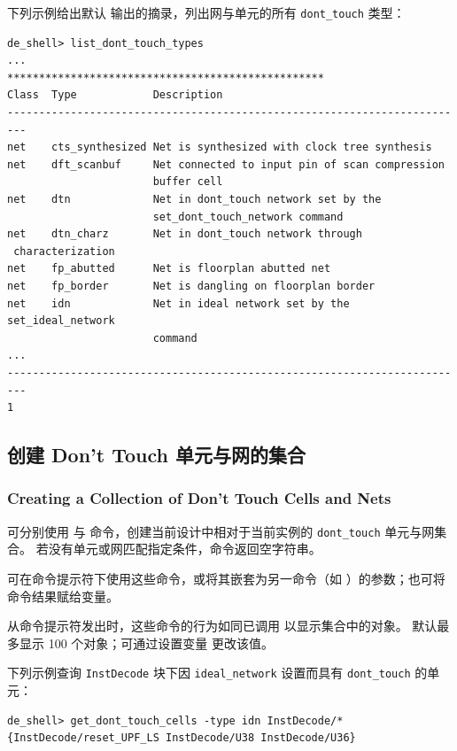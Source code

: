 下列示例给出默认  输出的摘录，列出网与单元的所有 \texttt{dont\_touch} 类型：
\begin{lstlisting}
de_shell> list_dont_touch_types
...
**************************************************
Class  Type            Description
-------------------------------------------------------------------------
net    cts_synthesized Net is synthesized with clock tree synthesis
net    dft_scanbuf     Net connected to input pin of scan compression
                       buffer cell
net    dtn             Net in dont_touch network set by the
                       set_dont_touch_network command
net    dtn_charz       Net in dont_touch network through
 characterization
net    fp_abutted      Net is floorplan abutted net
net    fp_border       Net is dangling on floorplan border
net    idn             Net in ideal network set by the set_ideal_network
                       command
...
-------------------------------------------------------------------------
1
\end{lstlisting}

\subsection{创建 Don't Touch 单元与网的集合}
\subsubsection*{Creating a Collection of Don't Touch Cells and Nets}

可分别使用  与  命令，创建当前设计中相对于当前实例的 \texttt{dont\_touch} 单元与网集合。
若没有单元或网匹配指定条件，命令返回空字符串。

可在命令提示符下使用这些命令，或将其嵌套为另一命令（如 ）的参数；也可将命令结果赋给变量。

从命令提示符发出时，这些命令的行为如同已调用  以显示集合中的对象。
默认最多显示 100 个对象；可通过设置变量  更改该值。

下列示例查询 \texttt{InstDecode} 块下因 \texttt{ideal\_network} 设置而具有 \texttt{dont\_touch} 的单元：
\begin{lstlisting}
de_shell> get_dont_touch_cells -type idn InstDecode/*
{InstDecode/reset_UPF_LS InstDecode/U38 InstDecode/U36}
\end{lstlisting}

